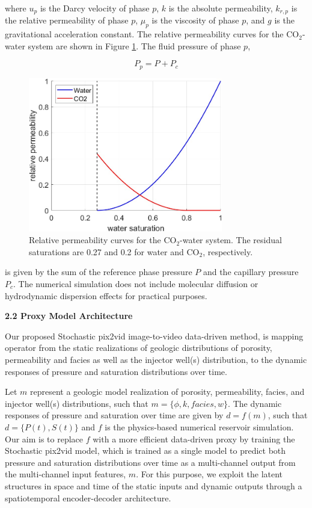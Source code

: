 \documentclass[10pt, twoside]{article}
\begin{document}
where $u_p$ is the Darcy velocity of phase $p$, $k$ is the absolute permeability, $k_{r,p}$ is the relative permeability of phase $p$, $\mu_p$ is the viscosity of phase $p$, and $g$ is the gravitational acceleration constant. The relative permeability curves for the CO$_2$-water system are shown in Figure \ref{relperms}. The fluid pressure of phase $p$,

\begin{equation} \label{eq5}
    P_p = P + P_c
\end{equation}

\begin{figure}
    \centering
    \includegraphics[width=8.5cm]{figures/relperms.jpg}
    \caption{Relative permeability curves for the CO$_2$-water system. The residual saturations are 0.27 and 0.2 for water and CO$_2$, respectively.}
    \label{relperms}
\end{figure}

is given by the sum of the reference phase pressure $P$ and the capillary pressure $P_c$. The numerical simulation does not include molecular diffusion or hydrodynamic dispersion effects for practical purposes.

\textbf{2.2 Proxy Model Architecture} 

Our proposed Stochastic pix2vid image-to-video data-driven method, is mapping operator from the static realizations of geologic distributions of porosity, permeability and facies as well as the injector well(s) distribution, to the dynamic responses of pressure and saturation distributions over time. 

Let $m$ represent a geologic model realization of porosity, permeability, facies, and injector well(s) distributions, such that $m = \{\phi,k,facies,w\}$. The dynamic responses of pressure and saturation over time are given by $d=f(m)$, such that $d=\{P(t), S(t)\}$ and $f$ is the physics-based numerical reservoir simulation. Our aim is to replace $f$ with a more efficient data-driven proxy by training the Stochastic pix2vid model, which is trained as a single model to predict both pressure and saturation distributions over time as a multi-channel output from the multi-channel input features, $m$. For this purpose, we exploit the latent structures in space and time of the static inputs and dynamic outputs through a spatiotemporal encoder-decoder architecture. 
\end{document}
